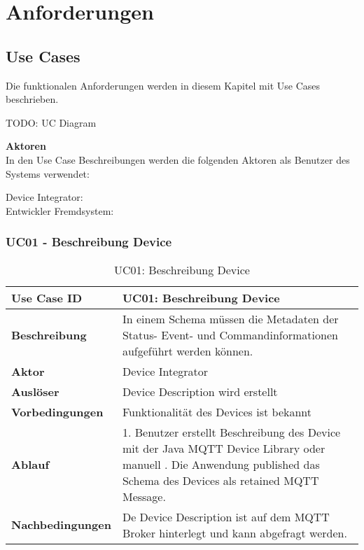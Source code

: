 \chapter{Anforderungen}
\label{chap:requirements}

\section{Use Cases}
Die funktionalen Anforderungen werden in diesem Kapitel mit Use Cases beschrieben.

TODO: UC Diagram

\textbf{Aktoren} \\
In den Use Case Beschreibungen werden die folgenden Aktoren als Benutzer des Systems verwendet:

Device Integrator:       \\
Entwickler Fremdsystem:  \\

\subsection{UC01 - Beschreibung Device}

\begin{table}[H]
\begin{tabularx}{\textwidth}{|l|X|}

 \hline
 {\bf Use Case ID }    & UC01: Beschreibung Device \\  \hline
 {\bf Beschreibung }   & In einem Schema müssen die Metadaten der Status- Event- und Commandinformationen aufgeführt werden können.
 \\ \hline
 {\bf Aktor }          & Device Integrator \\ \hline
 {\bf Auslöser }       & Device Description wird erstellt \\ \hline
 {\bf Vorbedingungen } & Funktionalität des Devices ist bekannt \\ \hline
 {\bf Ablauf }         & 
     1. Benutzer erstellt Beschreibung des Device mit der Java MQTT Device Library oder manuell \newline                                             
     2. Die Anwendung published das Schema des Devices als retained MQTT Message.  \\ \hline
 {\bf Nachbedingungen} & De Device Description ist auf dem MQTT Broker hinterlegt und kann abgefragt werden. \\ \hline
  
\end{tabularx}
\caption{UC01: Beschreibung Device}
\end{table}

